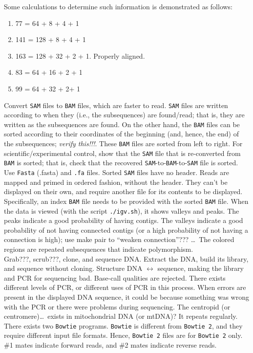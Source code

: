 Some calculations to determine such information is demonstrated as follows: \vspace{-0.3cm}
\begin{enumerate} \itemsep -4pt
\item 77 = 64 + 8 + 4 + 1
\item 141 = 128 + 8 + 4 + 1
\item 163 = 128 + 32 + 2 + 1. Properly aligned.
\item 83 = 64 + 16 + 2 + 1
\item 99 = 64 + 32 + 2+ 1
\end{enumerate}

Convert {\tt SAM} files to {\tt BAM} files, which are faster to read. {\tt SAM} files are written according to when they (i.e., the subsequences) are found/read; that is, they are written as the subsequences are found. On the other hand, the {\tt BAM} files can be sorted according to their coordinates of the beginning (and, hence, the end) of the subsequences; {\it verify this!!!}. These {\tt BAM} files are sorted from left to right. For scientific/experimental control, show that the {\tt SAM} file that is re-converted from {\tt BAM} is sorted; that is, check that the recovered {\tt SAM}-to-{\tt BAM}-to-{\tt SAM} file is sorted. \\

Use {\tt Fasta} (.fasta) and {\tt .fa} files. Sorted {\tt SAM} files have no header. Reads are mapped and primed in ordered fashion, without the header. They can't be displayed on their own, and require another file for its contents to be displayed. Specifically, an index {\tt BAM} file needs to be provided with the sorted {\tt BAM} file. When the data is viewed (with the script {\tt ./igv.sh}), it shows valleys and peaks. The peaks indicate a good probability of having contigs. The valleys indicate a good probability of not having connected contigs (or a high probability of not having a connection is high); use make pair to ``weaken connection''??? \dots\ The colored regions are repeated subsequences that indicate polymorphism. \\

Grab???, scrub???, clone, and sequence DNA. Extract the DNA, build its library, and sequence without cloning. Structure DNA $\longleftrightarrow$ sequence, making the library and PCR for sequencing bad. Base-call qualities are rejected. There exists different levels of PCR, or different uses of PCR in this process. When errors are present in the displayed DNA sequence, it could be because something was wrong with the PCR or there were problems during sequencing. The centropid (or centromere)\dots\ exists in mitochondrial DNA (or mtDNA)? It repeats regularly. \\

There exists two {\tt Bowtie} programs. {\tt Bowtie} is different from {\tt Bowtie 2}, and they require different input file formats. Hence, {\tt Bowtie 2} files are for {\tt Bowtie 2} only. \#1 mates indicate forward reads, and \#2 mates indicate reverse reads.










